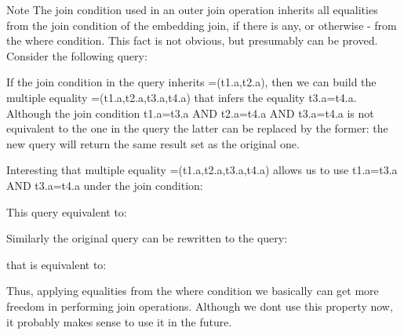 \begin{DoxyNote}{Note}
The join condition used in an outer join operation inherits all equalities from the join condition of the embedding join, if there is any, or otherwise -\/ from the where condition. This fact is not obvious, but presumably can be proved. Consider the following query\+: 
\begin{DoxyCode}{0}
\end{DoxyCode}
 If the join condition in the query inherits =(t1.\+a,t2.\+a), then we can build the multiple equality =(t1.\+a,t2.\+a,t3.\+a,t4.\+a) that infers the equality t3.\+a=t4.\+a. Although the join condition t1.\+a=t3.\+a A\+ND t2.\+a=t4.\+a A\+ND t3.\+a=t4.\+a is not equivalent to the one in the query the latter can be replaced by the former\+: the new query will return the same result set as the original one.
\end{DoxyNote}
Interesting that multiple equality =(t1.\+a,t2.\+a,t3.\+a,t4.\+a) allows us to use t1.\+a=t3.\+a A\+ND t3.\+a=t4.\+a under the join condition\+: 
\begin{DoxyCode}{0}
\end{DoxyCode}
 This query equivalent to\+: 
\begin{DoxyCode}{0}
\end{DoxyCode}
 Similarly the original query can be rewritten to the query\+: 
\begin{DoxyCode}{0}
\end{DoxyCode}
 that is equivalent to\+: 
\begin{DoxyCode}{0}
\end{DoxyCode}
 Thus, applying equalities from the where condition we basically can get more freedom in performing join operations. Although we don\textquotesingle{}t use this property now, it probably makes sense to use it in the future.


